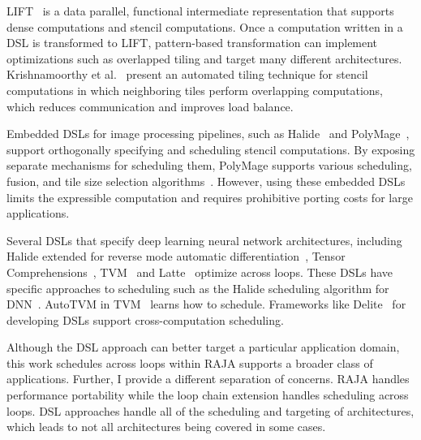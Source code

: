 LIFT~\cite{Hagedorn2018} is a data parallel, functional intermediate
representation that supports dense computations and stencil computations.
Once a computation written in a DSL is transformed to LIFT, pattern-based
transformation can implement optimizations such as overlapped tiling and
target many different architectures.
Krishnamoorthy et al.~\cite{Krishnamoorthy07} present an automated tiling
technique for stencil computations in which neighboring tiles perform
overlapping computations, which reduces communication and improves load
balance.

Embedded DSLs for image processing pipelines, such as
Halide~\cite{Ragan-Kelley2012,Ragan-Kelley2013} and
PolyMage~\cite{Mullapudi2015}, support orthogonally specifying and
scheduling stencil computations.
By exposing separate mechanisms for scheduling them, PolyMage supports
various scheduling, fusion, and tile size selection
algorithms~\cite{Mullapudi2016,Jangda2018,Adams2019}.
However, using these embedded DSLs limits the expressible computation and requires prohibitive porting costs for large applications.

Several DSLs that specify deep learning neural network
architectures, including Halide extended for reverse mode automatic
differentiation~\cite{Li2018}, Tensor Comprehensions~\cite{Vasilache2018},
TVM~\cite{TVM2018} and Latte~\cite{TruongLatte2016} optimize across loops.
These DSLs have specific approaches to scheduling such as the Halide scheduling
algorithm for DNN~\cite{Yang2020}.
AutoTVM in TVM~\cite{Chen2019} learns how to schedule.
Frameworks like Delite~\cite{Sujeeth2014} for developing DSLs support 
cross-computation scheduling.

Although the DSL approach can better target a particular application domain,
this work schedules across loops within RAJA supports a broader class of
applications.
Further, I provide a different separation of concerns. RAJA handles
performance portability while the loop chain extension handles scheduling
across loops.
DSL approaches handle all of the scheduling and targeting of architectures,
which leads to not all architectures being covered in some cases.

